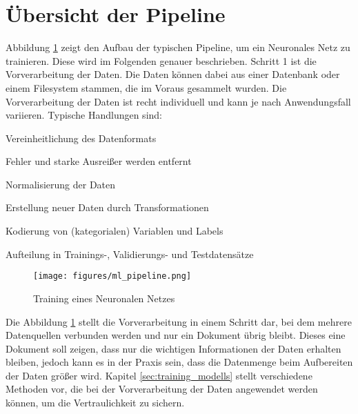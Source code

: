 \section{Übersicht der Pipeline}


Abbildung \ref{fig:ml_pipeline} zeigt den Aufbau der typischen Pipeline, um ein Neuronales Netz zu trainieren. 
Diese wird im Folgenden genauer beschrieben.
Schritt 1 ist die Vorverarbeitung der Daten.
Die Daten können dabei aus einer Datenbank oder einem Filesystem stammen, die im Voraus gesammelt wurden.
Die Vorverarbeitung der Daten ist recht individuell und kann je nach Anwendungsfall variieren. 
Typische Handlungen sind:
\begin{compactitem}
\item Vereinheitlichung des Datenformats
\item Fehler und starke Ausreißer werden entfernt
\item Normalisierung der Daten
\item Erstellung neuer Daten durch Transformationen
\item Kodierung von (kategorialen) Variablen und Labels
\item Aufteilung in Trainings-, Validierungs- und Testdatensätze
\end{compactitem}
\begin{figure}[!htb]
    \centering
    \texttt{[image: figures/ml\_pipeline.png]}
    \caption{Training eines Neuronalen Netzes}
    \label{fig:ml_pipeline}
\end{figure} 

Die Abbildung \ref{fig:ml_pipeline} stellt die Vorverarbeitung in einem Schritt dar, bei dem mehrere Datenquellen verbunden werden und nur ein Dokument übrig bleibt. 
Dieses eine Dokument soll zeigen, dass nur die wichtigen Informationen der Daten erhalten bleiben, jedoch kann es in der Praxis sein, dass die Datenmenge beim Aufbereiten der Daten größer wird. 
Kapitel \ref{sec:training_modells} stellt verschiedene Methoden vor, die bei der Vorverarbeitung der Daten angewendet werden können, um die Vertraulichkeit zu sichern.

